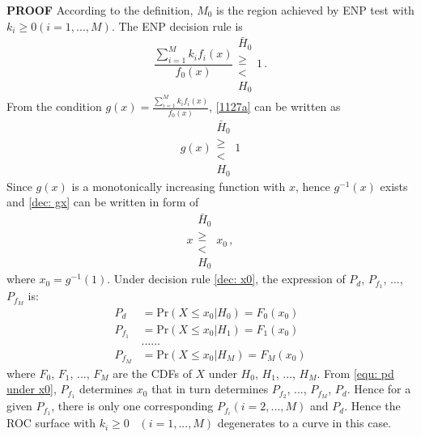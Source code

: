   \noindent \textbf{PROOF}
  According to the definition, $M_0$ is the region achieved by ENP test with $k_i \geq 0 (i=1, ..., M)$. The ENP decision rule is
  \begin{equation}
	\label{1127a}
	\frac{\sum_{i=1}^{M}k_if_i(x)}{f_0(x)} \substack{\bar{H}_0 \\\geq\\< \\H_0}1\,.
  \end{equation}
  From the condition $g(x) = \frac{\sum_{i=1}^{M}k_if_i(x)}{f_0(x)} $, \eqref{1127a} can be written as 
  \begin{equation}
	\label{dec: gx}
	g(x)\substack{\bar{H}_0 \\\geq\\< \\H_0}1
  \end{equation}
  Since $g(x)$ is a monotonically increasing function with $x$, hence $g^{-1}(x)$ exists and \eqref{dec: gx} can be written in form of 
  \begin{equation}
	\label{dec: x0}
	x\substack{\bar{H}_0 \\\geq\\< \\H_0}x_0\,,
  \end{equation}
  where $x_0 = g^{-1}(1)$.
  Under decision rule \eqref{dec: x0}, the expression of $P_d$, $P_{f_1}$, ..., $P_{f_M}$ is: 
  \begin{equation}
	\begin{split}
	  \label{equ: pd under x0}
	  P_d &= \text{Pr}(X \leq x_0 | H_0) = F_0(x_0)\\
	  P_{f_1} &= \text{Pr}(X \leq x_0 | H_1) = F_1(x_0)\\
	  &......\\
	  P_{f_M} &= \text{Pr}(X \leq x_0 | H_M) = F_M(x_0)
	\end{split}
  \end{equation}
  where $F_0$, $F_1$, ..., $F_M$ are the CDFs of $X$ under $H_0$, $H_1$, ..., $H_M$. From \eqref{equ: pd under x0}, $P_{f_1}$ determines $x_0$ that in turn determines $P_{f_2}$, ..., $P_{f_M}$, $P_d$. Hence for a given $P_{f_1}$, there is only one corresponding $P_{f_i} (i= 2, ..., M)$ and $P_d$. Hence the ROC surface with $k_i \geq 0\;\;\; (i = 1, ..., M)$ degenerates to a curve in this case.
  
